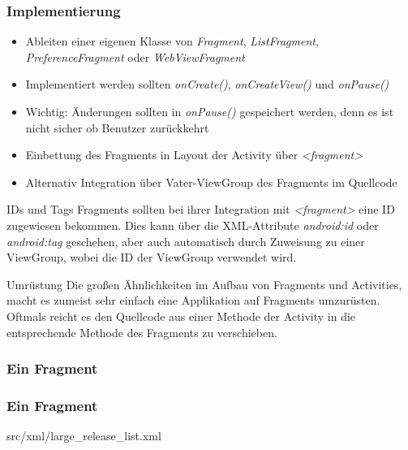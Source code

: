 \begin{frame}[label=fragment_implementation]
   \frametitle{Implementierung}
   \begin{itemize}
      \item Ableiten einer eigenen Klasse von \emph{Fragment}, \emph{ListFragment}, 
      	\emph{PreferenceFragment} oder \emph{WebViewFragment}
      \item Implementiert werden sollten \emph{onCreate()}, 
			\emph{onCreateView()} und \emph{onPause()}
      \item Wichtig: Änderungen sollten in \emph{onPause()} gespeichert werden, 
      	denn es ist nicht sicher ob Benutzer zurückkehrt
      \item Einbettung des Fragments in Layout der Activity über 
      	\emph{\textless{}fragment\textgreater}
      \item Alternativ Integration über Vater-ViewGroup des Fragments 
      	im Quellcode
   \end{itemize}

   \begin{alertblock}{IDs und Tags}
		Fragments sollten bei ihrer Integration mit \emph{\textless{}fragment\textgreater} 
		eine ID zugewiesen bekommen. Dies kann über die XML-Attribute \emph{android:id} oder 
		\emph{android:tag} geschehen, aber auch automatisch durch Zuweisung zu einer ViewGroup, 
		wobei die ID der ViewGroup verwendet wird.\\
   \end{alertblock}
   
   \begin{alertblock}{Umrüstung}
		Die großen Ähnlichkeiten im Aufbau von Fragments und Activities, macht es 
		zumeist sehr einfach eine Applikation auf Fragments umzurüsten. 
		Oftmals reicht es den Quellcode aus einer Methode der Activity in die 
		entsprechende Methode des Fragments zu verschieben.
   \end{alertblock}
\end{frame}

\begin{frame}[label=first_fragment]
   \frametitle{Ein Fragment}
	
\end{frame}

\begin{frame}[label=include_layout_fragment]
   \frametitle{Ein Fragment}
	
		{src/xml/large_release_list.xml}
\end{frame}

